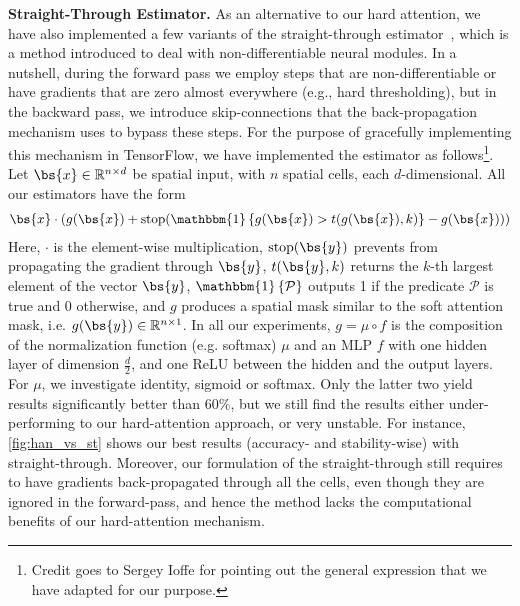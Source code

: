 \noindent\textbf{Straight-Through Estimator.}
As an alternative to our hard attention, we have also implemented a few variants of the straight-through estimator~\cite{bengio2013estimating}, which is a method introduced to deal with non-differentiable neural modules.
In a nutshell, during the forward pass we employ steps that are non-differentiable or have gradients that are zero almost everywhere (e.g., hard thresholding), but in the backward pass, we introduce skip-connections that the back-propagation mechanism uses to bypass these steps.
For the purpose of gracefully implementing this mechanism in TensorFlow, we have implemented the estimator as follows\footnote{Credit goes to Sergey Ioffe for pointing out the general expression that we have adapted for our purpose.}. Let $\bs{x} \in \mathbb{R}^{n \times d}$ be spatial input, with $n$ spatial cells, each $d$-dimensional. All our estimators have the form
\begin{align*}
\bs{x} \cdot (g(\bs{x}) + \text{stop}(\mathbbm{1}\left\{g(\bs{x}) > t(g(\bs{x}), k)\right\} - g(\bs{x}) ))
\end{align*}
Here, $\cdot$ is the element-wise multiplication, $\text{stop}(\bs{y})$ prevents from propagating the gradient through $\bs{y}$,  $t(\bs{y},k)$ returns the $k$-th largest element of the vector $\bs{y}$, $\mathbbm{1}\left\{\mathcal{P}\right\}$ outputs 1 if the predicate $\mathcal{P}$ is true and 0 otherwise, and $g$ produces a spatial mask similar to the soft attention mask, i.e. $g(\bs{y}) \in \mathbb{R}^{n \times 1}$. In all our experiments, $g = \mu \circ f$ is the composition of the normalization function (e.g. softmax) $\mu$ and an MLP $f$ with one hidden layer of dimension $\frac{d}{2}$, and one ReLU between the hidden and the output layers. For $\mu$, we investigate identity, sigmoid or softmax. Only the latter two yield results significantly better than $60\%$, but we still find the results either under-performing to our hard-attention approach, or very unstable. For instance, \autoref{fig:han_vs_st} shows our best results (accuracy- and stability-wise) with straight-through. Moreover, our formulation of the straight-through still requires to have gradients back-propagated through all the cells, even though they are ignored in the forward-pass, and hence the method lacks the computational benefits of our hard-attention mechanism.


